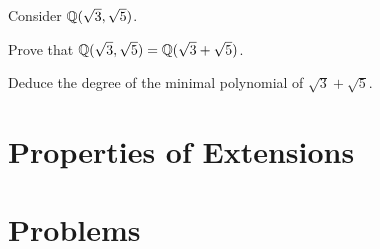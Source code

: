 \begin{exercise}
    Consider $\mathbb{Q}(\sqrt3,\sqrt5)$.
    \begin{partquestions}{\roman*}
        \item Prove that $\mathbb{Q}(\sqrt3,\sqrt5) = \mathbb{Q}(\sqrt3+\sqrt5)$.
        \item Deduce the degree of the minimal polynomial of $\sqrt3+\sqrt5$.
    \end{partquestions}
\end{exercise}

\section{Properties of Extensions}

\newpage

\section{Problems}
